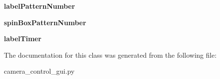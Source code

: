 \begin{DoxyCompactItemize}
\item 
\hypertarget{classcamera__control__gui_1_1Ui__Dialog_a9f23f27389782761db8028c6b991e6fe}{{\bfseries label\-Pattern\-Number}}\label{classcamera__control__gui_1_1Ui__Dialog_a9f23f27389782761db8028c6b991e6fe}

\item 
\hypertarget{classcamera__control__gui_1_1Ui__Dialog_a1e1a777fdf0d94d1e15e9945bf85473e}{{\bfseries spin\-Box\-Pattern\-Number}}\label{classcamera__control__gui_1_1Ui__Dialog_a1e1a777fdf0d94d1e15e9945bf85473e}

\item 
\hypertarget{classcamera__control__gui_1_1Ui__Dialog_a393a561527348e796b3c57402fa8fb51}{{\bfseries label\-Timer}}\label{classcamera__control__gui_1_1Ui__Dialog_a393a561527348e796b3c57402fa8fb51}

\end{DoxyCompactItemize}


The documentation for this class was generated from the following file\-:\begin{DoxyCompactItemize}
\item 
camera\-\_\-control\-\_\-gui.\-py\end{DoxyCompactItemize}
